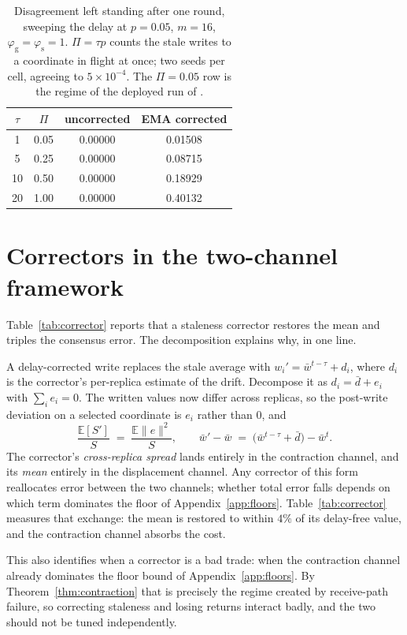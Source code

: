 \documentclass{article}
\theoremstyle{plain}
\newcommand{\pg}{\varphi_{\mathrm{g}}}
\newcommand{\ps}{\varphi_{\mathrm{s}}}
\newcommand{\E}{\mathbb{E}}
\begin{document}
\begin{table}[h]
\centering\small
\caption{Disagreement left standing after one round, sweeping the delay at
$p{=}0.05$, $m{=}16$, $\pg{=}\ps{=}1$. $\Pi=\tau p$ counts the stale writes to a
coordinate in flight at once; two seeds per cell, agreeing to $5\times10^{-4}$.
The $\Pi{=}0.05$ row is the regime of the deployed run of
\citet{avraham2026agora}.}
\label{tab:ei}
\begin{tabular}{cccc}
\toprule
$\tau$ & $\Pi$ & uncorrected & EMA corrected \\
\midrule
 1 & 0.05 & 0.00000 & 0.01508 \\
 5 & 0.25 & 0.00000 & 0.08715 \\
10 & 0.50 & 0.00000 & 0.18929 \\
20 & 1.00 & 0.00000 & 0.40132 \\
\bottomrule
\end{tabular}
\end{table}

\section{Correctors in the two-channel framework}\label{app:corrector}

Table~\ref{tab:corrector} reports that a staleness corrector restores the
mean and triples the consensus error. The decomposition explains why, in one
line.

A delay-corrected write replaces the stale average with
$w_i' = \bar w^{t-\tau} + d_i$, where $d_i$ is the corrector's per-replica
estimate of the drift. Decompose it as $d_i = \bar d + e_i$ with
$\sum_i e_i = 0$. The written values now differ across replicas, so the
post-write deviation on a selected coordinate is $e_i$ rather than $0$, and
\begin{equation}
\frac{\E[S']}{S} \;=\; \frac{\E\|e\|^2}{S},
\qquad
\bar w' - \bar w \;=\; \big(\bar w^{t-\tau} + \bar d\big) - \bar w^t .
\end{equation}
The corrector's \emph{cross-replica spread} lands entirely in the contraction
channel, and its \emph{mean} entirely in the displacement channel. Any corrector
of this form reallocates error between the two channels; whether total error
falls depends on which term dominates the floor of
Appendix~\ref{app:floors}. Table~\ref{tab:corrector} measures that exchange: the mean is restored
to within $4\%$ of its delay-free value, and the contraction channel absorbs
the cost.

This also identifies when a corrector is a bad trade: when the contraction
channel already dominates the floor bound of Appendix~\ref{app:floors}. By
Theorem~\ref{thm:contraction} that is precisely the regime created by
receive-path failure, so correcting staleness and losing returns interact
badly, and the two should not be tuned independently.
\end{document}
